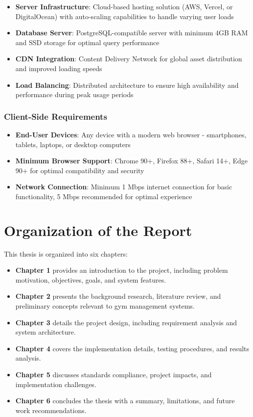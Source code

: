 \documentclass[12pt,a4paper]{report}
\begin{document}
\begin{itemize}[leftmargin=*]
    \item \textbf{Server Infrastructure}: Cloud-based hosting solution (AWS, Vercel, or DigitalOcean) with auto-scaling capabilities to handle varying user loads
    \item \textbf{Database Server}: PostgreSQL-compatible server with minimum 4GB RAM and SSD storage for optimal query performance
    \item \textbf{CDN Integration}: Content Delivery Network for global asset distribution and improved loading speeds
    \item \textbf{Load Balancing}: Distributed architecture to ensure high availability and performance during peak usage periods
\end{itemize}

\subsubsection{Client-Side Requirements}

\begin{itemize}[leftmargin=*]
    \item \textbf{End-User Devices}: Any device with a modern web browser - smartphones, tablets, laptops, or desktop computers
    \item \textbf{Minimum Browser Support}: Chrome 90+, Firefox 88+, Safari 14+, Edge 90+ for optimal compatibility and security
    \item \textbf{Network Connection}: Minimum 1 Mbps internet connection for basic functionality, 5 Mbps recommended for optimal experience
\end{itemize}

\section{Organization of the Report}
\label{sec:organization}

This thesis is organized into six chapters:

\begin{itemize}[leftmargin=*]
    \item \textbf{Chapter 1} provides an introduction to the project, including problem motivation, objectives, goals, and system features.
    \item \textbf{Chapter 2} presents the background research, literature review, and preliminary concepts relevant to gym management systems.
    \item \textbf{Chapter 3} details the project design, including requirement analysis and system architecture.
    \item \textbf{Chapter 4} covers the implementation details, testing procedures, and results analysis.
    \item \textbf{Chapter 5} discusses standards compliance, project impacts, and implementation challenges.
    \item \textbf{Chapter 6} concludes the thesis with a summary, limitations, and future work recommendations.
\end{itemize}
\end{document}
